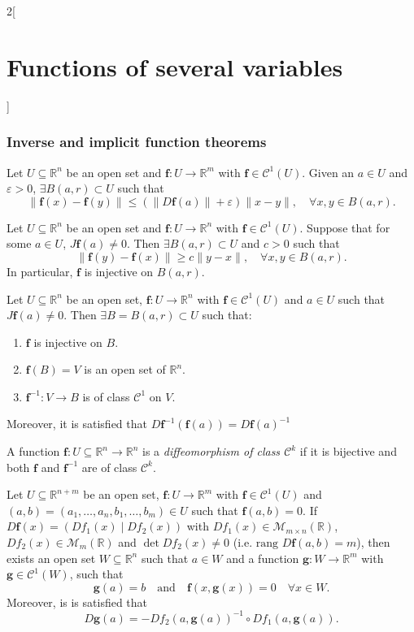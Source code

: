 \documentclass[class=article,10pt,crop=false]{standalone}
\begin{document}
\begin{multicols}{2}[\section{Functions of several variables}]
\subsubsection*{Inverse and implicit function theorems}
\begin{lemma}
Let $U\subseteq\mathbb{R}^n$ be an open set and $\boldsymbol{f}:U\rightarrow\mathbb{R}^m$ with $\boldsymbol{f}\in \mathcal{C}^1(U)$. Given an $a\in U$ and $\varepsilon>0$, $\exists B(a,r)\subset U$ such that $$\|\boldsymbol{f}(x)-\boldsymbol{f}(y)\|\leq(\|D\boldsymbol{f}(a)\|+\varepsilon)\|x-y\|,\quad\forall x,y\in B(a,r).$$
\end{lemma}
\begin{lemma}
Let $U\subseteq\mathbb{R}^n$ be an open set and $\boldsymbol{f}:U\rightarrow\mathbb{R}^n$ with $\boldsymbol{f}\in \mathcal{C}^1(U)$. Suppose that for some $a\in U$, $J\boldsymbol{f}(a)\ne 0$. Then $\exists B(a,r)\subset U$ and $c>0$ such that $$\|\boldsymbol{f}(y)-\boldsymbol{f}(x)\|\geq c\|y-x\|,\quad\forall x,y\in B(a,r).$$ In particular, $\boldsymbol{f}$ is injective on $B(a,r)$.
\end{lemma}
\begin{theorem}
Let $U\subseteq\mathbb{R}^n$ be an open set, $\boldsymbol{f}:U\rightarrow\mathbb{R}^n$ with $\boldsymbol{f}\in \mathcal{C}^1(U)$ and $a\in U$ such that $J\boldsymbol{f}(a)\ne0$. Then $\exists B=B(a,r)\subset U$ such that:
\begin{enumerate}
    \item $\boldsymbol{f}$ is injective on $B$.
    \item $\boldsymbol{f}(B)=V$ is an open set of $\mathbb{R}^n$.
    \item $\boldsymbol{f}^{-1}:V\rightarrow B$ is of class $\mathcal{C}^1$ on $V$.
\end{enumerate} Moreover, it is satisfied that $D\boldsymbol{f}^{-1}(\boldsymbol{f}(a))=D\boldsymbol{f}(a)^{-1}$
\end{theorem}
\begin{definition}
A function $\boldsymbol{f}:U\subseteq\mathbb{R}^n\rightarrow\mathbb{R}^n$ is a \textit{diffeomorphism of class $\mathcal{C}^k$} if it is bijective and both $\boldsymbol{f}$ and $\boldsymbol{f}^{-1}$ are of class $\mathcal{C}^k$.
\end{definition}
\begin{theorem}
Let $U\subseteq\mathbb{R}^{n+m}$ be an open set, $\boldsymbol{f}:U\rightarrow\mathbb{R}^m$ with $\boldsymbol{f}\in \mathcal{C}^1(U)$ and $(a,b)=(a_1,\ldots,a_n,b_1,\ldots,b_m)\in U$ such that $\boldsymbol{f}(a,b)=0$. If $D\boldsymbol{f}(x)=(Df_1(x)\;|\;Df_2(x))$ with $Df_1(x)\in\mathcal{M}_{m\times n}(\mathbb{R})$, $Df_2(x)\in\mathcal{M}_m(\mathbb{R})$ and $\det Df_2(x)\ne 0$ (i.e. $\text{rang }D\boldsymbol{f}(a,b)=m$), then exists an open set $W\subseteq\mathbb{R}^n$ such that $a\in W$ and a function $\boldsymbol{g}:W\rightarrow\mathbb{R}^m$ with $\boldsymbol{g}\in\mathcal{C}^1(W)$, such that $$\boldsymbol{g}(a)=b\quad\text{and}\quad \boldsymbol{f}(x,\boldsymbol{g}(x))=0\quad\forall x\in W.$$ Moreover, is is satisfied that $$D\boldsymbol{g}(a)=-Df_2(a,\boldsymbol{g}(a))^{-1}\circ Df_1(a,\boldsymbol{g}(a)).$$

\end{theorem}
\end{multicols}
\end{document}

